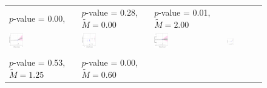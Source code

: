 \documentclass[12pt]{article}
\begin{document}
\begin{figure}[!h]
{\begin{tabular}{C{3.8cm}C{3.8cm}C{3.8cm}C{3.8cm}}
   \citet{Distelhorst2018} \newline $p$-value = 0.00,  &
   \citet{eckhouse2022metrics} \newline $p$-value = 0.28, $\tilde{M} = 0.00$ &
     \citet{Fouirnaies2018ajps} \newline $p$-value = 0.01, $\tilde{M} = 2.00$\\
   \hspace{-2em} \includegraphics[width = 0.22\textwidth]{figure/placebo_honest/Cox_honest_placebo.png} &
   \hspace{-2em}\includegraphics[width = 0.22\textwidth]{figure/placebo_honest/distelhorst_honest_placebo} &
  \hspace{-2em} \includegraphics[width = 0.22\textwidth]{figure/placebo_honest/eckhouse_honest_placebo.png}  &
    \hspace{-2em} \includegraphics[width = 0.22\textwidth]{figure/placebo_honest/Fouirnaies_honest_placebo.png}\\ \\
   \citet{fh2018} \newline $p$-value = 0.53, $\tilde{M} = 1.25$ &
   \citet{Fouirnaies2022} \newline $p$-value = 0.00, $\tilde{M} = 0.60$   &   

\end{tabular}}
\end{figure}
\end{document}
